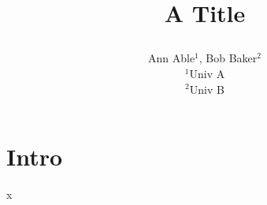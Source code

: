 \documentclass{article}
\begin{document}
\title{A Title\\
\author{Ann Able$^1$, Bob Baker$^2$\\ $^1$Univ A\\ $^2$Univ B}}
\section{Intro}
x
\end{document}
